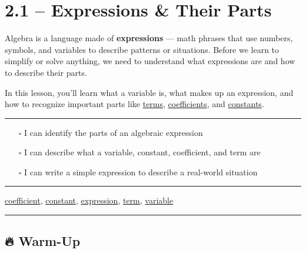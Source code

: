 \documentclass[
  letterpaper,
  DIV=11,
  numbers=noendperiod]{scrreprt}
\providecommand{\tightlist}{%
  \setlength{\itemsep}{0pt}\setlength{\parskip}{0pt}}
\begin{document}
\chapter*{2.1 -- Expressions \& Their
Parts}\label{expressions-their-parts}


Algebra is a language made of \textbf{expressions} --- math phrases that
use numbers, symbols, and variables to describe patterns or situations.
Before we learn to simplify or solve anything, we need to understand
what expressions are and how to describe their parts.

In this lesson, you'll learn what a variable is, what makes up an
expression, and how to recognize important parts like
\href{./glossary.html\#glossary-term}{terms},
\href{./glossary.html\#glossary-coefficient}{coefficients}, and
\href{./glossary.html\#glossary-constant}{constants}.

\begin{center}\rule{0.5\linewidth}{0.5pt}\end{center}

\begin{itemize}
\tightlist
\item[$\square$]
  I can identify the parts of an algebraic expression\\
\item[$\square$]
  I can describe what a variable, constant, coefficient, and term are\\
\item[$\square$]
  I can write a simple expression to describe a real-world situation\\
\end{itemize}

\begin{center}\rule{0.5\linewidth}{0.5pt}\end{center}

\href{./glossary.html\#glossary-coefficient}{coefficient},
\href{./glossary.html\#glossary-constant}{constant},
\href{./glossary.html\#glossary-expression}{expression},
\href{./glossary.html\#glossary-term}{term},
\href{./glossary.html\#glossary-variable}{variable}

\begin{center}\rule{0.5\linewidth}{0.5pt}\end{center}

\section*{🔥 Warm-Up}\label{warm-up-7}
\end{document}
